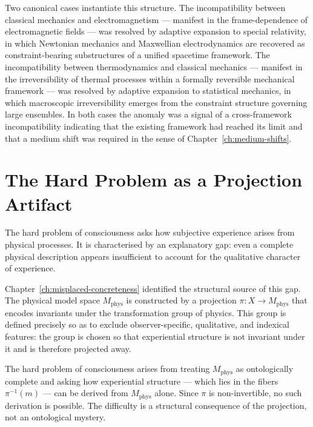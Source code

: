 \documentclass[11pt,openany]{book}
\begin{document}
Two canonical cases instantiate this structure.  The
incompatibility between classical mechanics and
electromagnetism — manifest in the frame-dependence of
electromagnetic fields — was resolved by adaptive expansion
to special relativity, in which Newtonian mechanics and
Maxwellian electrodynamics are recovered as
constraint-bearing substructures of a unified spacetime
framework.  The incompatibility between thermodynamics and
classical mechanics — manifest in the irreversibility of
thermal processes within a formally reversible mechanical
framework — was resolved by adaptive expansion to
statistical mechanics, in which macroscopic irreversibility
emerges from the constraint structure governing large
ensembles.  In both cases the anomaly was a signal of a
cross-framework incompatibility indicating that the existing
framework had reached its limit and that a medium shift was
required in the sense of Chapter~\ref{ch:medium-shifts}.

\section{The Hard Problem as a Projection Artifact}
\label{sec:hard-problem}

The hard problem of consciousness asks how subjective
experience arises from physical processes.  It is
characterised by an explanatory gap: even a complete
physical description appears insufficient to account for
the qualitative character of experience.

Chapter~\ref{ch:misplaced-concreteness} identified the
structural source of this gap.  The physical model space
$M_{\mathrm{phys}}$ is constructed by a projection $\pi :
X \to M_{\mathrm{phys}}$ that encodes invariants under the
transformation group of physics.  This group is defined
precisely so as to exclude observer-specific, qualitative,
and indexical features: the group is chosen so that
experiential structure is not invariant under it and is
therefore projected away.

\begin{proposition}
\label{prop:hard-problem}
The hard problem of consciousness arises from treating
$M_{\mathrm{phys}}$ as ontologically complete and asking
how experiential structure --- which lies in the fibers
$\pi^{-1}(m)$ --- can be derived from $M_{\mathrm{phys}}$
alone.  Since $\pi$ is non-invertible, no such derivation
is possible.  The difficulty is a structural consequence
of the projection, not an ontological mystery.
\end{proposition}
\end{document}
